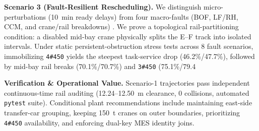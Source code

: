 \documentclass[11pt,a4paper]{article}
\begin{document}
{\noindent\textbf{Scenario 3 (Fault-Resilient Rescheduling).}
We distinguish micro-perturbations (10~min ready delays) from four macro-faults (BOF, LF/RH, CCM, and crane/rail breakdowns) \cite{liu2021ladle}. We prove a topological rail-partitioning condition: a disabled mid-bay crane physically splits the E--F track into isolated intervals. Under static persistent-obstruction stress tests across 8 fault scenarios, immobilizing \texttt{4\#450} yields the steepest task-service drop (46.2\%/47.7\%), followed by mid-bay rail breaks (70.1\%/70.7\%) and \texttt{3\#450} (75.1\%/79.4%

\noindent\textbf{Verification \& Operational Value.}
Scenario-1 trajectories pass independent continuous-time rail auditing (12.24--12.50~m clearance, 0 collisions, automated \texttt{pytest} suite). Conditional plant recommendations include maintaining east-side transfer-car grouping, keeping 150~t cranes on outer boundaries, prioritizing \texttt{4\#450} availability, and enforcing dual-key MES identity joins.

\vspace{0.3em}
\begin{table}[H]
\centering
\footnotesize
\caption*{Headline Performance Summary Across Scenarios 1--3}
\end{table}
}
\newpage
\tableofcontents
\newpage
\end{document}

